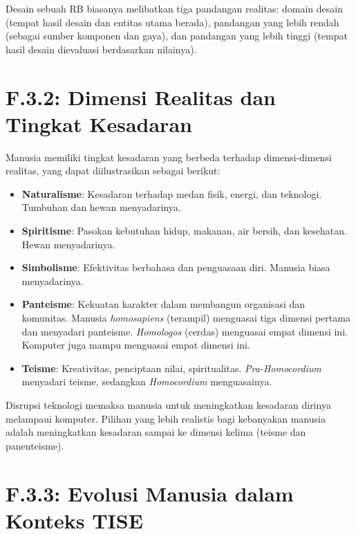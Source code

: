 \documentclass[
  letterpaper,
  DIV=11,
  numbers=noendperiod]{scrreprt}
\providecommand{\tightlist}{%
  \setlength{\itemsep}{0pt}\setlength{\parskip}{0pt}}
\begin{document}
Desain sebuah RB biasanya melibatkan tiga pandangan realitas: domain
desain (tempat hasil desain dan entitas utama berada), pandangan yang
lebih rendah (sebagai sumber komponen dan gaya), dan pandangan yang
lebih tinggi (tempat hasil desain dievaluasi berdasarkan nilainya).

\section{\texorpdfstring{\textbf{F.3.2: Dimensi Realitas dan Tingkat
Kesadaran}}{F.3.2: Dimensi Realitas dan Tingkat Kesadaran}}\label{f.3.2-dimensi-realitas-dan-tingkat-kesadaran}

Manusia memiliki tingkat kesadaran yang berbeda terhadap dimensi-dimensi
realitas, yang dapat diilustrasikan sebagai berikut:

\begin{itemize}
\tightlist
\item
  \textbf{Naturalisme}: Kesadaran terhadap medan fisik, energi, dan
  teknologi. Tumbuhan dan hewan menyadarinya.
\item
  \textbf{Spiritisme}: Pasokan kebutuhan hidup, makanan, air bersih, dan
  kesehatan. Hewan menyadarinya.
\item
  \textbf{Simbolisme}: Efektivitas berbahasa dan penguasaan diri.
  Manusia biasa menyadarinya.
\item
  \textbf{Panteisme}: Kekuatan karakter dalam membangun organisasi dan
  komunitas. Manusia \emph{homosapiens} (terampil) menguasai tiga
  dimensi pertama dan menyadari panteisme. \emph{Homologos} (cerdas)
  menguasai empat dimensi ini. Komputer juga mampu menguasai empat
  dimensi ini.
\item
  \textbf{Teisme}: Kreativitas, penciptaan nilai, spiritualitas.
  \emph{Pra-Homocordium} menyadari teisme, sedangkan \emph{Homocordium}
  menguasainya.
\end{itemize}

Disrupsi teknologi memaksa manusia untuk meningkatkan kesadaran dirinya
melampaui komputer. Pilihan yang lebih realistis bagi kebanyakan manusia
adalah meningkatkan kesadaran sampai ke dimensi kelima (teisme dan
panenteisme).

\section{\texorpdfstring{\textbf{F.3.3: Evolusi Manusia dalam Konteks
TISE}}{F.3.3: Evolusi Manusia dalam Konteks TISE}}\label{f.3.3-evolusi-manusia-dalam-konteks-tise}
\end{document}
